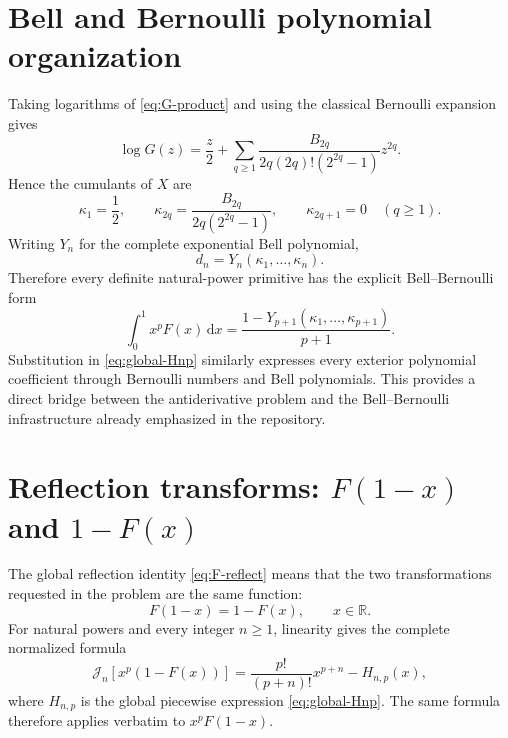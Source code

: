 \documentclass[11pt,oneside]{article}
\theoremstyle{definition}
\theoremstyle{remark}
\newcommand{\R}{\mathbb R}
\newcommand{\dd}{\,\mathrm d}
\newcommand{\Jn}{\mathcal J}
\newcommand{\1}{\mathbf 1}
\begin{document}
\section{Bell and Bernoulli polynomial organization}

Taking logarithms of \eqref{eq:G-product} and using the classical Bernoulli
expansion gives
\begin{equation}
 \log G(z)=\frac z2+
 \sum_{q\geq1}
 \frac{B_{2q}}{2q(2q)!(2^{2q}-1)}z^{2q}.                       \label{eq:logG-Bernoulli}
\end{equation}
Hence the cumulants of \(X\) are
\begin{equation}
 \kappa_1=\frac12,\qquad
 \kappa_{2q}=\frac{B_{2q}}{2q(2^{2q}-1)},\qquad
 \kappa_{2q+1}=0\quad(q\geq1).                                \label{eq:cumulants}
\end{equation}
Writing \(Y_n\) for the complete exponential Bell polynomial,
\begin{equation}
 d_n=Y_n(\kappa_1,\ldots,\kappa_n).                             \label{eq:d-Bell}
\end{equation}
Therefore every definite natural-power primitive has the explicit
Bell--Bernoulli form
\begin{equation}
 \int_0^1x^pF(x)\dd x
 =\frac{1-Y_{p+1}(\kappa_1,\ldots,\kappa_{p+1})}{p+1}.          \label{eq:A-Bell}
\end{equation}
Substitution in \eqref{eq:global-Hnp} similarly expresses every exterior
polynomial coefficient through Bernoulli numbers and Bell polynomials.  This
provides a direct bridge between the antiderivative problem and the
Bell--Bernoulli infrastructure already emphasized in the repository.

\section{Reflection transforms: \texorpdfstring{$F(1-x)$}{F(1-x)} and
\texorpdfstring{$1-F(x)$}{1-F(x)}}

The global reflection identity \eqref{eq:F-reflect} means that the two
transformations requested in the problem are the same function:
\begin{equation}
 F(1-x)=1-F(x),\qquad x\in\R.                                  \label{eq:transforms-same}
\end{equation}
For natural powers and every integer \(n\geq1\), linearity gives the complete
normalized formula
\begin{equation}
 \boxed{\quad
 \Jn_n[x^p(1-F(x))]
 =\frac{p!}{(p+n)!}x^{p+n}-H_{n,p}(x),
 \quad}                                                        \label{eq:complement-np}
\end{equation}
where \(H_{n,p}\) is the global piecewise expression
\eqref{eq:global-Hnp}.  The same formula therefore applies verbatim to
\(x^pF(1-x)\).
\end{document}
